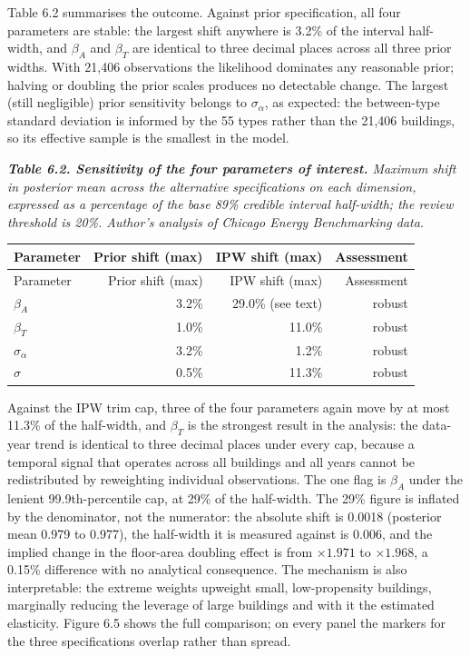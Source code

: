Table 6.2 summarises the outcome. Against prior specification, all four parameters are stable: the largest shift anywhere is 3.2\% of the interval half-width, and $\beta_A$ and $\beta_T$ are identical to three decimal places across all three prior widths. With 21,406 observations the likelihood dominates any reasonable prior; halving or doubling the prior scales produces no detectable change. The largest (still negligible) prior sensitivity belongs to $\sigma_\alpha$, as expected: the between-type standard deviation is informed by the 55 types rather than the 21,406 buildings, so its effective sample is the smallest in the model.

\par\medskip\noindent
{\small\itshape \textbf{Table 6.2. Sensitivity of the four parameters of interest.} Maximum shift in posterior mean across the alternative specifications on each dimension, expressed as a percentage of the base 89\% credible interval half-width; the review threshold is 20\%. Author's analysis of Chicago Energy Benchmarking data.\par}
\nopagebreak\medskip\nopagebreak
{
\setlength{\tabcolsep}{7pt}
\renewcommand{\arraystretch}{1.15}
\begin{longtable}{lrrr}
\toprule
Parameter & Prior shift (max) & IPW shift (max) & Assessment \\
\midrule
\endfirsthead
\toprule
Parameter & Prior shift (max) & IPW shift (max) & Assessment \\
\midrule
\endhead
\bottomrule
\endlastfoot
$\beta_A$ & 3.2\% & 29.0\% (see text) & robust \\
$\beta_T$ & 1.0\% & 11.0\% & robust \\
$\sigma_\alpha$ & 3.2\% & 1.2\% & robust \\
$\sigma$ & 0.5\% & 11.3\% & robust \\
\end{longtable}
}
\par\medskip

Against the IPW trim cap, three of the four parameters again move by at most 11.3\% of the half-width, and $\beta_T$ is the strongest result in the analysis: the data-year trend is identical to three decimal places under every cap, because a temporal signal that operates across all buildings and all years cannot be redistributed by reweighting individual observations. The one flag is $\beta_A$ under the lenient 99.9th-percentile cap, at 29\% of the half-width. The 29\% figure is inflated by the denominator, not the numerator: the absolute shift is 0.0018 (posterior mean 0.979 to 0.977), the half-width it is measured against is 0.006, and the implied change in the floor-area doubling effect is from $\times 1.971$ to $\times 1.968$, a 0.15\% difference with no analytical consequence. The mechanism is also interpretable: the extreme weights upweight small, low-propensity buildings, marginally reducing the leverage of large buildings and with it the estimated elasticity. Figure 6.5 shows the full comparison; on every panel the markers for the three specifications overlap rather than spread.

